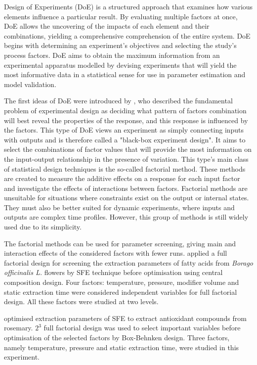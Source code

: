 \documentclass[../Article_Sensitivity_Analsysis.tex]{subfiles}
\begin{document}
	
	Design of Experiments (DoE) is a structured approach that examines how various elements influence a particular result. By evaluating multiple factors at once, DoE allows the uncovering of the impacts of each element and their combinations, yielding a comprehensive comprehension of the entire system. DoE begins with determining an experiment's objectives and selecting the study's process factors. DoE aims to obtain the maximum information from an experimental apparatus modelled by devising experiments that will yield the most informative data in a statistical sense for use in parameter estimation and model validation. 
	
	The first ideas of DoE were introduced by \citet{Fisher1935}, who described the fundamental problem of experimental design as deciding what pattern of factors combination will best reveal the properties of the response, and this response is influenced by the factors. This type of DoE views an experiment as simply connecting inputs with outputs and is therefore called a "black-box experiment design". It aims to select the combinations of factor values that will provide the most information on the input-output relationship in the presence of variation. This type's main class of statistical design techniques is the so-called factorial method. These methods are created to measure the additive effects on a response for each input factor and investigate the effects of interactions between factors. Factorial methods are unsuitable for situations where constraints exist on the output or internal states. They must also be better suited for dynamic experiments, where inputs and outputs are complex time profiles. However, this group of methods is still widely used due to its simplicity.
	
	The factorial methods can be used for parameter screening, giving main and interaction effects of the considered factors with fewer runs. \citet{Ramandi2011} applied a full factorial design for screening the extraction parameters of fatty acids from \textit{Borago officinalis L.} flowers by SFE technique before optimisation using central composition design. Four factors: temperature, pressure, modifier volume and static extraction time were considered independent variables for full factorial design. All these factors were studied at two levels. 
	
	\citet{Caldera2012} optimised extraction parameters of SFE to extract antioxidant compounds from rosemary. $2^3$ full factorial design was used to select important variables before optimisation of the selected factors by Box-Behnken design. Three factors, namely temperature, pressure and static extraction time, were studied in this experiment.
	
\end{document}
